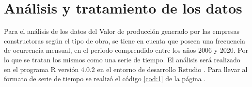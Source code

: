 \documentclass{article}
\begin{document}
\section{Análisis y tratamiento de los datos}

 Para el análisis de los datos del Valor de producción generado por las empresas constructoras según el tipo de obra, se tiene en cuenta que poseen una frecuencia de ocurrencia mensual, en el periodo comprendido entre los años 2006 y 2020. Por lo que se tratan los mismos como una serie de tiempo. El análisis será realizado en el programa R versión 4.0.2 \cite{r} en el entorno de desarrollo Rstudio \cite{rstudio}. Para llevar al formato de serie de tiempo se realizó el código \ref{cod:1} de la página \pageref{cod:1}.
\begin{center}

\label{cod:1}
\end{center}
\end{document}
